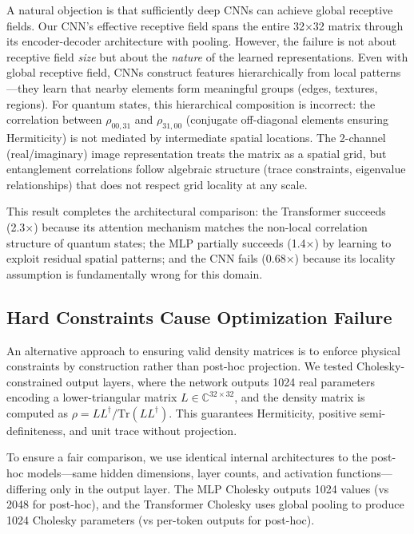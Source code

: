 \documentclass[11pt]{article}
\begin{document}
A natural objection is that sufficiently deep CNNs can achieve global receptive fields. Our CNN's effective receptive field spans the entire 32×32 matrix through its encoder-decoder architecture with pooling. However, the failure is not about receptive field \emph{size} but about the \emph{nature} of the learned representations. Even with global receptive field, CNNs construct features hierarchically from local patterns—they learn that nearby elements form meaningful groups (edges, textures, regions). For quantum states, this hierarchical composition is incorrect: the correlation between \(\rho_{00,31}\) and \(\rho_{31,00}\) (conjugate off-diagonal elements ensuring Hermiticity) is not mediated by intermediate spatial locations. The 2-channel (real/imaginary) image representation treats the matrix as a spatial grid, but entanglement correlations follow algebraic structure (trace constraints, eigenvalue relationships) that does not respect grid locality at any scale.

This result completes the architectural comparison: the Transformer succeeds (2.3×) because its attention mechanism matches the non-local correlation structure of quantum states; the MLP partially succeeds (1.4×) by learning to exploit residual spatial patterns; and the CNN fails (0.68×) because its locality assumption is fundamentally wrong for this domain.
\subsection{Hard Constraints Cause Optimization Failure}
\label{sec:org4e4e4fd}

An alternative approach to ensuring valid density matrices is to enforce physical constraints by construction rather than post-hoc projection. We tested Cholesky-constrained output layers, where the network outputs 1024 real parameters encoding a lower-triangular matrix \(L \in \mathbb{C}^{32 \times 32}\), and the density matrix is computed as \(\rho = LL^\dagger / \mathrm{Tr}(LL^\dagger)\). This guarantees Hermiticity, positive semi-definiteness, and unit trace without projection.

To ensure a fair comparison, we use identical internal architectures to the post-hoc models—same hidden dimensions, layer counts, and activation functions—differing only in the output layer. The MLP Cholesky outputs 1024 values (vs 2048 for post-hoc), and the Transformer Cholesky uses global pooling to produce 1024 Cholesky parameters (vs per-token outputs for post-hoc).
\end{document}
